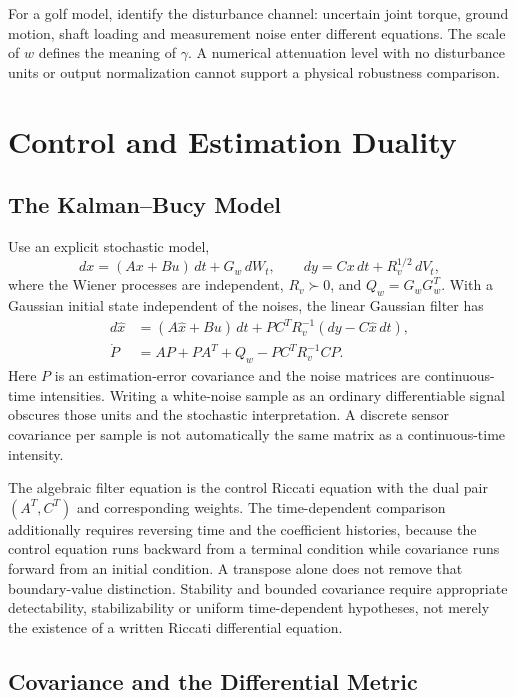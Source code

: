 For a golf model, identify the disturbance channel: uncertain joint torque, ground motion, shaft loading and measurement noise enter different equations. The scale of $w$ defines the meaning of $\gamma$. A numerical attenuation level with no disturbance units or output normalization cannot support a physical robustness comparison.

\section{Control and Estimation Duality}

\subsection{The Kalman--Bucy Model}

Use an explicit stochastic model,
\begin{equation}
dx=(Ax+Bu)\,dt+G_w\,dW_t,\qquad
dy=Cx\,dt+R_v^{1/2}\,dV_t,
\end{equation}
where the Wiener processes are independent, $R_v\succ0$, and $Q_w=G_wG_w^T$. With a Gaussian initial state independent of the noises, the linear Gaussian filter has
\begin{equation}
\begin{aligned}
d\hat x&=(A\hat x+Bu)\,dt+
PC^TR_v^{-1}(dy-C\hat x\,dt),\\
\dot P&=AP+PA^T+Q_w-PC^TR_v^{-1}CP.
\end{aligned}
\end{equation}
Here $P$ is an estimation-error covariance and the noise matrices are continuous-time intensities. Writing a white-noise sample as an ordinary differentiable signal obscures those units and the stochastic interpretation. A discrete sensor covariance per sample is not automatically the same matrix as a continuous-time intensity.

The algebraic filter equation is the control Riccati equation with the dual pair $(A^T,C^T)$ and corresponding weights. The time-dependent comparison additionally requires reversing time and the coefficient histories, because the control equation runs backward from a terminal condition while covariance runs forward from an initial condition. A transpose alone does not remove that boundary-value distinction. Stability and bounded covariance require appropriate detectability, stabilizability or uniform time-dependent hypotheses, not merely the existence of a written Riccati differential equation.

\subsection{Covariance and the Differential Metric}

